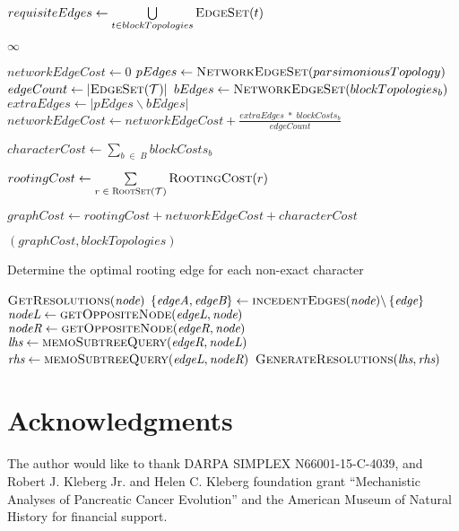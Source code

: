 \documentclass[12pt]{article}
\begin{document}
{\begin{algorithm}
\begin{algorithmic}[1]
		\State $requisiteEdges \gets \bigcup\limits_{t \in blockTopologies} \Call{EdgeSet}{t}$
		
		   \State \Return $\infty$
		\EndIf
		
		\State $networkEdgeCost \gets 0$
		\State $pEdges \gets \Call{NetworkEdgeSet}{parsimoniousTopology}$
		\State $edgeCount \gets |\Call{EdgeSet}{\mathcal{T}}|$
		  \State $bEdges \gets \Call{NetworkEdgeSet}{blockTopologies_b}$
		  \State $extraEdges \gets |pEdges \backslash bEdges |$
		  \State $networkEdgeCost \gets networkEdgeCost + \frac{extraEdges \;*\; blockCosts_b}{edgeCount}$
		\EndFor
		
		\State $characterCost \gets \sum\limits_{b\; \in\; B} blockCosts_{b}$
		
		\State $rootingCost \gets \sum\limits_{r\; \in\; \Call{RootSet}{\mathcal{T}}} \Call{RootingCost}{r}$
		
		\State $graphCost \gets rootingCost + networkEdgeCost + characterCost$

		\State \Return $(graphCost, blockTopologies)$
		\EndFunction
	\end{algorithmic}
\end{algorithm}


\begin{algorithm}
	\caption{Determine the optimal rooting edge for each non-exact character}
	\label{Alg:generate-resolutions}
	\begin{algorithmic}[1]
		\State \Return $\Call{GetResolutions}{\textit{node}}$
		\EndIf
		\State $\left\{ \textit{edgeA}, \textit{edgeB} \right\} \gets \Call{incedentEdges}{\textit{node}} \backslash \left\{ \textit{edge} \right\}$
		\State $\textit{nodeL} \gets \Call{getOppositeNode}{ \textit{edgeL}, \textit{node} }$
		\State $\textit{nodeR} \gets \Call{getOppositeNode}{ \textit{edgeR}, \textit{node} }$
		\State $\textit{lhs} \gets \Call{memoSubtreeQuery}{\textit{edgeR},\textit{nodeL}}$
		\State $\textit{rhs} \gets \Call{memoSubtreeQuery}{\textit{edgeL},\textit{nodeR}}$
		\State \Return $\Call{GenerateResolutions}{\textit{lhs}, \textit{rhs}}$
		\EndFunction
	\end{algorithmic}
\end{algorithm}


\restoregeometry
}


\section*{Acknowledgments}
The author would like to thank DARPA SIMPLEX N66001-15-C-4039, and Robert J. Kleberg Jr. and Helen C. Kleberg foundation grant ``Mechanistic Analyses of Pancreatic Cancer Evolution'' and the American Museum of Natural History for financial support. 
\end{document}
